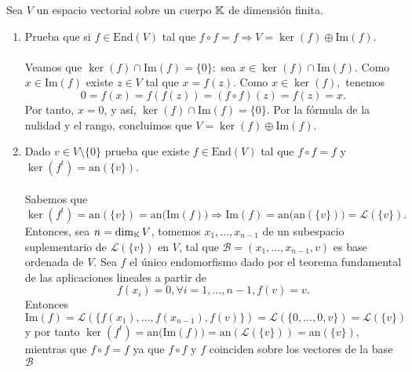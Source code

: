 \documentclass[12pt]{article}
\begin{document}
    \begin{ejercicio}[2.5 puntos]
        Sea $V$ un espacio vectorial sobre un cuerpo ${\mathbb{K}}$ de dimensión finita.
        \begin{enumerate}[label=(\alph*)]
        \item Prueba que si $f \in \text{End}(V)$ tal que $f \circ f = f \Rightarrow V = \ker(f) \oplus \text{Im}(f).$ \\\\
        Veamos que $ \ker(f) \cap \text{Im}(f) = \{0\}:$ sea $x \in \ker(f) \cap \text{Im}(f).$ Como $x \in \text{Im}(f)$ existe $z \in V$ tal que $x = f(z)$. Como $x \in \ker(f),$ tenemos
        \begin{equation*}
            0 = f(x) = f(f(z)) = (f \circ f)(z) = f(z) = x.
        \end{equation*}
        Por tanto, $x = 0$, y así, $\ker(f) \cap \text{Im}(f) = \{0\}.$
        Por la fórmula de la nulidad y el rango, concluimos que $V = \ker(f) \oplus \text{Im}(f)$.
        \item Dado $v \in V \setminus \{0\}$ prueba que existe $f \in \text{End}(V)$ tal que $f \circ f = f$ y $\ker(f^t) = \text{an}(\{v\})$. \\\\
        Sabemos que 
        \begin{equation*}
            \ker(f^t) = \text{an}(\{v\}) = \text{an(Im}(f)) \Rightarrow \text{Im}(f) = \text{an(an}(\{v\})) = \mathcal{L}(\{v\}).
        \end{equation*}
        Entonces, sea $n = \dim_{\mathbb{K}} V$, tomemos $x_1,\dotsc,x_{n-1}$ de un subespacio suplementario de $\mathcal{L}(\{v\})$ en $V$, tal que $\mathcal{B} = (x_1,\dotsc, x_{n-1}, v)$ es base ordenada de $V$. Sea $f$ el único endomorfismo dado por el teorema fundamental de las aplicaciones lineales a partir de
        \begin{equation*}
            f(x_i) = 0, \forall i = 1,\dotsc, n-1, f(v) = v.
        \end{equation*}
        Entonces
        \begin{equation*}
            \text{Im}(f) = \mathcal{L}(\{f(x_1),\dotsc, f(x_{n-1}), f(v)\}) = \mathcal{L}(\{0, \dotsc, 0, v\}) = \mathcal{L}(\{v\})
        \end{equation*}
        y por tanto $\ker(f^t) = \text{an(Im}(f)) = \text{an}(\mathcal{L}(\{v\})) = \text{an}(\{v\}),$ mientras que $f \circ f = f$ ya que $f \circ f$ y $f$ coinciden sobre los vectores de la base $\mathcal{B}$ 
        \end{enumerate}
    \end{ejercicio}
\end{document}
